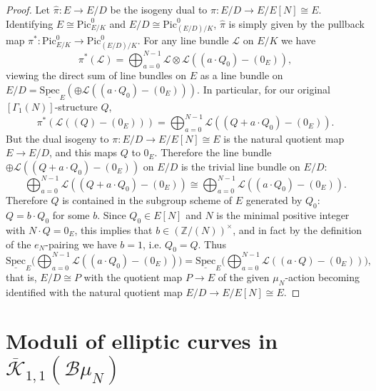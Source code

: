 \documentclass[11pt]{amsart}
\theoremstyle{definition}
\begin{document}
\begin{proof}
Let $\hat{\pi}: E \rightarrow E/D$ be the isogeny dual to $\pi: E/D \rightarrow E/E[N] \cong E$. Identifying $E \cong \mathrm{Pic}^0_{E/K}$ and $E/D \cong \mathrm{Pic}^0_{(E/D)/K}$, $\hat{\pi}$ is simply given by the pullback map $\pi^*: \mathrm{Pic}^0_{E/K} \rightarrow \mathrm{Pic}^0_{(E/D)/K}$. For any line bundle ${\mathcal{L}}$ on $E/K$ we have 
\begin{displaymath}
\pi^*({\mathcal{L}}) = \bigoplus_{a = 0}^{N-1} {\mathcal{L}} \otimes {\mathcal{L}}((a\cdot Q_0)-(0_E)),
\end{displaymath}
viewing the direct sum of line bundles on $E$ as a line bundle on $E/D = \underline{\mathrm{Spec}}_E( \oplus {\mathcal{L}}((a\cdot Q_0)-(0_E)))$. In particular, for our original $[\Gamma_1(N)]$-structure $Q$,
\begin{displaymath}
\pi^* ({\mathcal{L}}((Q)-(0_E))) = \bigoplus_{a = 0}^{N-1} {\mathcal{L}}((Q+a\cdot Q_0)-(0_E)).
\end{displaymath}
But the dual isogeny to $\pi: E/D \rightarrow E/E[N]\cong E$ is the natural quotient map $E \rightarrow E/D$, and this maps $Q$ to $0_E$. Therefore the line bundle $\oplus {\mathcal{L}}((Q+a\cdot Q_0)-(0_E))$ on $E/D$ is the trivial line bundle on $E/D$:
\begin{displaymath}
\bigoplus_{a = 0}^{N-1} {\mathcal{L}}((Q+a\cdot Q_0)-(0_E)) \cong \bigoplus_{a = 0}^{N-1} {\mathcal{L}}((a\cdot Q_0)-(0_E)).
\end{displaymath}
Therefore $Q$ is contained in the subgroup scheme of $E$ generated by $Q_0$: $Q = b\cdot Q_0$ for some $b$. Since $Q_0 \in E[N]$ and $N$ is the minimal positive integer with $N\cdot Q = 0_E$, this implies that $b \in (\mathbb{Z}/(N))^\times$, and in fact by the definition of the $e_N$-pairing we have $b = 1$, i.e. $Q_0 = Q$. Thus
\begin{displaymath}
\underline{\mathrm{Spec}}_E \big( \bigoplus_{a = 0}^{N-1} {\mathcal{L}}((a\cdot Q_0)-(0_E)) \big) = \underline{\mathrm{Spec}}_E \big( \bigoplus_{a = 0}^{N-1} {\mathcal{L}}((a\cdot Q)-(0_E)) \big),
\end{displaymath}
that is, $E/D \cong P$ with the quotient map $P \rightarrow E$ of the given $\mu_N$-action becoming identified with the natural quotient map $E/D \rightarrow E/E[N] \cong E$.
\end{proof}

\section{Moduli of elliptic curves in $\overline{\mathcal{K}}_{1,1}({\mathcal{B}} \mu_N)$}
\end{document}
